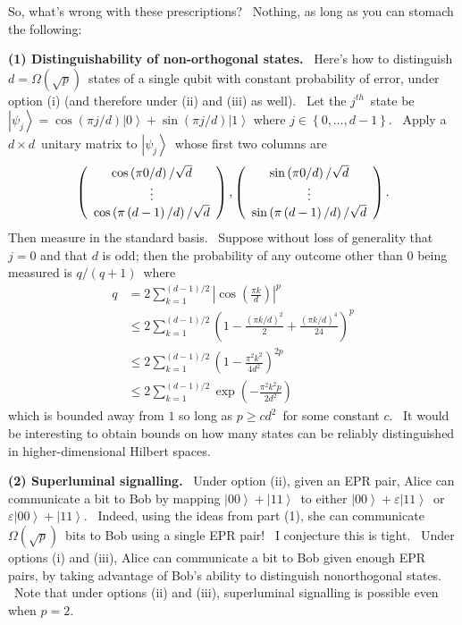 \documentclass{article}%
\begin{document}
So, what's wrong with these prescriptions? \ Nothing, as long as you can
stomach the following:

\textbf{(1) Distinguishability of non-orthogonal states.} \ Here's how to
distinguish $d=\Omega\left(  \sqrt{p}\right)  $\ states of a single qubit with
constant probability of error, under option (i) (and therefore under (ii) and
(iii) as well). \ Let the $j^{th}$\ state be $\left\vert \psi_{j}\right\rangle
=\cos\left(  \pi j/d\right)  \left\vert 0\right\rangle +\sin\left(  \pi
j/d\right)  \left\vert 1\right\rangle $ where $j\in\left\{  0,\ldots
,d-1\right\}  $. \ Apply a $d\times d$\ unitary matrix to $\left\vert \psi
_{j}\right\rangle $\ whose first two columns are%
\[
\left(
\begin{array}
[c]{c}%
\cos\left(  \pi0/d\right)  /\sqrt{d}\\
\vdots\\
\cos\left(  \pi\left(  d-1\right)  /d\right)  /\sqrt{d}%
\end{array}
\right)  ,\left(
\begin{array}
[c]{c}%
\sin\left(  \pi0/d\right)  /\sqrt{d}\\
\vdots\\
\sin\left(  \pi\left(  d-1\right)  /d\right)  /\sqrt{d}%
\end{array}
\right)  .
\]
Then measure in the standard basis. \ Suppose without loss of generality that
$j=0$ and that $d$ is odd; then the probability of any outcome other than $0$
being measured is $q/\left(  q+1\right)  $\ where%
\begin{align*}
q  &  =2\sum_{k=1}^{\left(  d-1\right)  /2}\left\vert \cos\left(  \frac{\pi
k}{d}\right)  \right\vert ^{p}\\
&  \leq2\sum_{k=1}^{\left(  d-1\right)  /2}\left(  1-\frac{\left(  \pi
k/d\right)  ^{2}}{2}+\frac{\left(  \pi k/d\right)  ^{4}}{24}\right)  ^{p}\\
&  \leq2\sum_{k=1}^{\left(  d-1\right)  /2}\left(  1-\frac{\pi^{2}k^{2}%
}{4d^{2}}\right)  ^{2p}\\
&  \leq2\sum_{k=1}^{\left(  d-1\right)  /2}\exp\left(  -\frac{\pi^{2}k^{2}%
p}{2d^{2}}\right)
\end{align*}
which is bounded away from $1$ so long as $p\geq cd^{2}$\ for some constant
$c$. \ It would be interesting to obtain bounds on how many states can be
reliably distinguished in higher-dimensional Hilbert spaces.

\textbf{(2) Superluminal signalling.} \ Under option (ii), given an EPR pair,
Alice can communicate a bit to Bob by mapping $\left\vert 00\right\rangle
+\left\vert 11\right\rangle $\ to either $\left\vert 00\right\rangle
+\varepsilon\left\vert 11\right\rangle $\ or $\varepsilon\left\vert
00\right\rangle +\left\vert 11\right\rangle $. \ Indeed, using the ideas from
part (1), she can communicate $\Omega\left(  \sqrt{p}\right)  $\ bits to Bob
using a single EPR pair! \ I conjecture this is tight. \ Under options (i) and
(iii), Alice can communicate a bit to Bob given enough EPR pairs, by taking
advantage of Bob's ability to distinguish nonorthogonal states. \ Note that
under options (ii) and (iii), superluminal signalling is possible even when
$p=2$.
\end{document}
